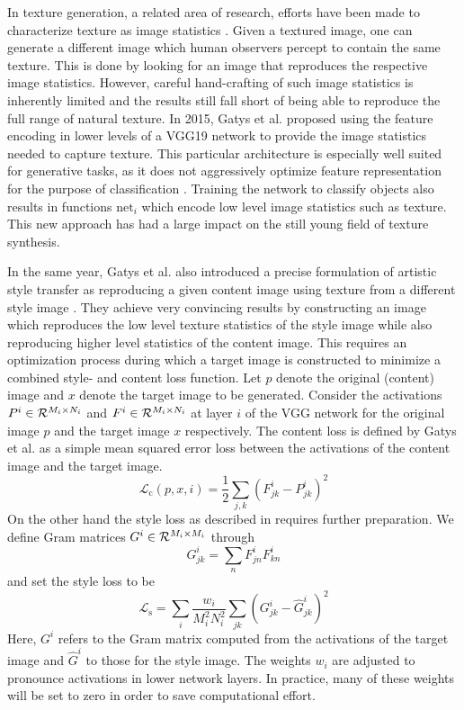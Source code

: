 In texture generation, a related area of research, efforts have been made to characterize texture as image statistics \cite{julesz1962visual,heeger1995pyramid,rosenholtz2012summary}. Given a textured image, one can generate a different image which human observers percept to contain the same texture. This is done by looking for an image that reproduces the respective image statistics. However, careful hand-crafting of such image statistics is inherently limited and the results still fall short of being able to reproduce the full range of natural texture. In 2015, Gatys et al. \cite{gatys2015texture} proposed using the feature encoding in lower levels of a VGG19 network \cite{vgg2014} to provide the image statistics needed to capture texture. This particular architecture is especially well suited for generative tasks, as it does not aggressively optimize feature representation for the purpose of classification \cite{nikulin2016exploring}. Training the network to classify objects also results in functions \(\text{net}_i\) which encode low level image statistics such as texture. This new approach has had a large impact on the still young field of texture synthesis.


In the same year, Gatys et al. also introduced a precise formulation of artistic style transfer as reproducing a given content image using texture from a different style image \cite{gatys2015neural}. They achieve very convincing results by constructing an image which reproduces the low level texture statistics of the style image while also reproducing higher level statistics of the content image. 
This requires an optimization process during which a target image is constructed to minimize a combined style- and content loss function.
Let \(p\) denote the original (content) image and \(x\) denote the target image to be generated. 
Consider the activations \(P^i\in \mathcal{R}^{M_i\times N_i}\) and \(F^i\in \mathcal{R}^{M_i\times N_i}\) at layer \(i\) of the VGG network for the original image \(p\) and the target image \(x\) respectively.
The content loss is defined by Gatys et al. as a simple mean squared error loss between the activations of the content image and the target image.
\[\mathcal{L}_\text{c}(p,x,i) = \frac{1}{2}\sum_{j,k} (F^i_{jk}-P^i_{jk})^2\]
On the other hand the style loss as described in \cite{gatys2015texture} requires further preparation. We define Gram matrices \(G^i\in \mathcal{R}^{M_i\times M_i}\) through
\[G^i_{jk} = \sum_n F^i_{jn}F^i_{kn}\]
and set the style loss to be 
\[\mathcal{L}_\text{s} = \sum_i \frac{w_i}{M_i^2N_i^2} \sum_{jk} (G^i_{jk}-\hat G^i_{jk})^2\]
Here, \(G^i\) refers to the Gram matrix computed from the activations of the target image and \(\hat G^i\) to those for the style image. The weights \(w_i\) are adjusted to pronounce activations in lower network layers. In practice, many of these weights will be set to zero in order to save computational effort.

